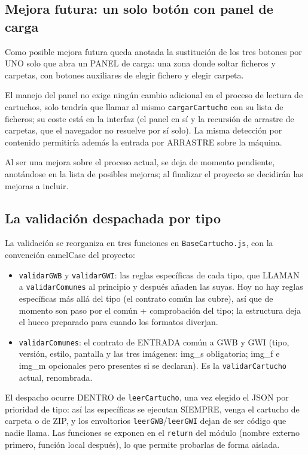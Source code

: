 \subsection{Mejora futura: un solo botón con panel de carga}
\label{sec:F5I9Unificacion}

Como posible mejora futura queda anotada la sustitución de los tres
botones por UNO solo que abra un PANEL de carga: una zona donde
soltar ficheros y carpetas, con botones auxiliares de elegir fichero
y elegir carpeta.

El manejo del panel no exige ningún cambio adicional en el proceso
de lectura de cartuchos, solo tendría que llamar al mismo
\texttt{cargarCartucho} con su lista de ficheros; su coste está en
la interfaz (el panel en sí y la recursión de arrastre de carpetas,
que el navegador no resuelve por sí solo). La misma detección por
contenido permitiría además la entrada por ARRASTRE sobre la
máquina.

Al ser una mejora sobre el proceso actual, se deja de momento
pendiente, anotándose en la lista de posibles mejoras; al finalizar
el proyecto se decidirán las mejoras a incluir.

\subsection{La validación despachada por tipo}
\label{sec:F5I9Validacion}

La validación se reorganiza en tres funciones en
\texttt{BaseCartucho.js}, con la convención camelCase del proyecto:

\begin{itemize}
	\item \texttt{validarGWB} y \texttt{validarGWI}: las reglas
	específicas de cada tipo, que LLAMAN a \texttt{validarComunes} al
	principio y después añaden las suyas. Hoy no hay reglas
	específicas más allá del tipo (el contrato común las cubre), así que
	de momento son paso por el común + comprobación del tipo; la
	estructura deja el hueco preparado para cuando los formatos
	diverjan.
	
	\item \texttt{validarComunes}: el contrato de ENTRADA común a
	GWB y GWI (tipo, versión, estilo, pantalla y las tres imágenes:
	img\_s obligatoria; img\_f e img\_m opcionales pero presentes si
	se declaran). Es la \texttt{validarCartucho} actual, renombrada.
\end{itemize}

El despacho ocurre DENTRO de \texttt{leerCartucho}, una vez elegido
el JSON por prioridad de tipo: así las específicas se ejecutan
SIEMPRE, venga el cartucho de carpeta o de ZIP, y los envoltorios
\texttt{leerGWB}/\texttt{leerGWI} dejan de ser código que nadie
llama. Las funciones se exponen en el \texttt{return} del módulo
(nombre externo primero, función local después), lo que permite
probarlas de forma aislada.

